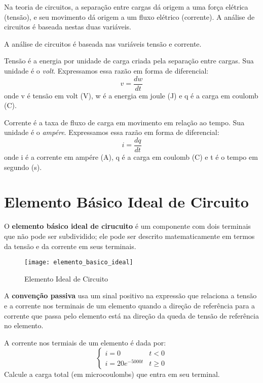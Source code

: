 Na teoria de circuitos, a separação entre cargas dá origem a uma força elétrica (tensão), e seu movimento dá origem a um fluxo elétrico (corrente). A análise de circuitos é baseada nestas duas variáveis.

A análise de circuitos é baseada nas variáveis tensão e corrente.

\begin{definition}[Tensão]
 Tensão é a energia por unidade de carga criada pela separação entre cargas. Sua unidade é o \textit{volt}. Expressamos essa razão em forma de diferencial:
\begin{equation}
v = \frac{d w}{dt}
\end{equation}
onde v é tensão em volt (V), w é a energia em joule (J) e q é a carga em coulomb (C).
\end{definition}

\begin{definition}[Corrente]
 Corrente é a taxa de fluxo de carga em movimento em relação ao tempo. Sua unidade é o \textit{ampére}. Expressamos essa razão em forma de diferencial:
\begin{equation}
i = \frac{d q}{dt}
\end{equation}
onde i é a corrente em ampére (A), q é a carga em coulomb (C) e t é o tempo em segundo (s).
\end{definition}

\section{Elemento Básico Ideal de Circuito}

O \textbf{elemento básico ideal de cirucuito} é um componente com dois terminais que não pode ser subdividido; ele pode ser descrito matematicamente em termos da tensão e da corrente em seus terminais.

\begin{figure}[h]
\centering\texttt{[image: elemento\_basico\_ideal]}
\caption{Elemento Ideal de Circuito}
\end{figure}

A \textbf{convenção passiva} usa um sinal positivo na expressão que relaciona a tensão e a corrente nos terminais de um elemento quando a direção de referência  para a corrente que passa pelo elemento está na direção da queda de tensão de referência no elemento.

\begin{exercise}
 A corrente nos termiais de um elemento é dada por:
 \[
 \begin{cases}
  i = 0 & t < 0 \\
  i = 20e^{-5000t} & t \ge 0
 \end{cases}
 \]
 Calcule a carga total (em microcoulombs) que entra em seu terminal.
\end{exercise}

